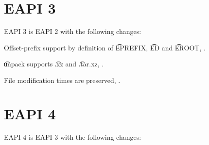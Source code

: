 \section{EAPI 3}

EAPI 3 is EAPI 2 with the following changes:
\begin{compactitem}
\item Offset-prefix support by definition of \t{EPREFIX}, \t{ED} and \t{EROOT},
    .
\item \t{unpack} supports \t{.xz} and \t{.tar.xz}, .
\item File modification times are preserved, .
\end{compactitem}

\section{EAPI 4}

EAPI 4 is EAPI 3 with the following changes:


